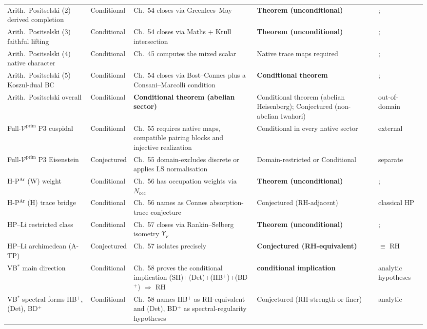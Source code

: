 \begin{longtable}{p{}|p{}|p{}|p{}|p{}}
Arith.~Positselski (2) derived completion & Conditional &
Ch.~54 closes via Greenlees--May & \textbf{Theorem (unconditional)} &; \\
Arith.~Positselski (3) faithful lifting & Conditional & Ch.~54
closes via Matlis + Krull intersection &
\textbf{Theorem (unconditional)} &; \\
Arith.~Positselski (4) native character & Conditional &
Ch.~45 computes the mixed scalar & Native trace maps required &; \\
Arith.~Positselski (5) Koszul-dual BC & Conditional & Ch.~54
closes via Bost--Connes plus a Consani--Marcolli condition &
\textbf{Conditional theorem} &; \\
Arith.~Positselski overall & Conditional &
\textbf{Conditional theorem (abelian sector)} & Conditional theorem (abelian Heisenberg);
Conjectured (non-abelian Iwahori) & out-of-domain \\
Full-\(\mathcal{V}^{\mathrm{prim}}\) P3 cuspidal & Conditional
& Ch.~55 requires native maps, compatible pairing blocks and injective realization
& Conditional in every native sector & external \\
Full-\(\mathcal{V}^{\mathrm{prim}}\) P3 Eisenstein & Conjectured &
Ch.~55 domain-excludes discrete or applies LS normalisation &
Domain-restricted or Conditional & separate \\
H-P\(^{\mathrm{Ar}}\) (W) weight & Conditional & Ch.~56
has occupation weights via \(N_{\mathrm{occ}}\) &
\textbf{Theorem (unconditional)} &; \\
H-P\(^{\mathrm{Ar}}\) (H) trace bridge & Conditional & Ch.~56
names as Connes absorption-trace conjecture & Conjectured
(RH-adjacent) & classical HP \\
HP--Li restricted class & Conditional & Ch.~57 closes via
Rankin--Selberg isometry \(\Upsilon_{F}\) &
\textbf{Theorem (unconditional)} &; \\
HP--Li archimedean (A-TP) & Conjectured & Ch.~57 isolates
precisely & \textbf{Conjectured (RH-equivalent)} & \(\equiv\) RH \\
VB\(^{*}\) main direction & Conditional & Ch.~58 proves the
conditional implication
(SH)+(Det)+(HB\(^{+}\))+(BD\(^{+}\)) \(\Rightarrow\) RH &
\textbf{conditional implication} & analytic hypotheses \\
VB\(^{*}\) spectral forms HB\(^{+}\), (Det), BD\(^{+}\) &
Conditional & Ch.~58 names HB\(^{+}\) as RH-equivalent and
(Det), BD\(^{+}\) as spectral-regularity hypotheses &
Conjectured (RH-strength or finer) & analytic \\

\end{longtable}
